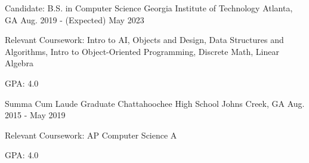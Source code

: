 


\begin{cventries}

\cventry
{Candidate: B.S. in Computer Science}
{Georgia Institute of Technology}
{Atlanta, GA}
{Aug. 2019 - (Expected) May 2023}
{\begin{cvitems}
\item {Relevant Coursework: Intro to AI, Objects and Design, Data Structures and Algorithms, Intro to Object-Oriented Programming, Discrete Math, Linear Algebra}
\item {GPA: 4.0}
\end{cvitems}
}

\cventry
{Summa Cum Laude Graduate} %
{Chattahoochee High School} %
{Johns Creek, GA} %
{Aug. 2015 - May 2019} %
{ %
\begin{cvitems}
\item {Relevant Coursework: AP Computer Science A}
\item{GPA: 4.0}
\end{cvitems}
}

\end{cventries}